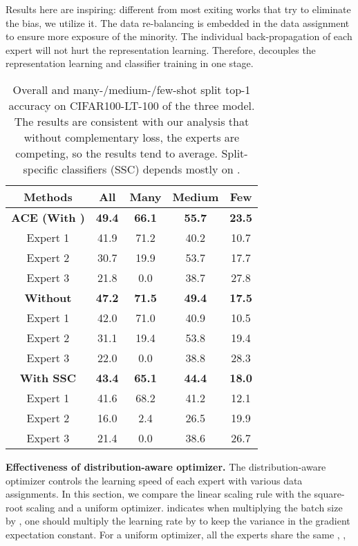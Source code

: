 \documentclass[10pt,twocolumn,letterpaper]{article}
\begin{document}
Results here are inspiring: different from most exiting works that try to eliminate the bias, we utilize it. The data re-balancing is embedded in the data assignment to ensure more exposure of the minority. The individual back-propagation of each expert will not hurt the representation learning. Therefore,  decouples the representation learning and classifier training in one stage.

\begin{table}[h]
\begin{center}
\small
\begin{tabular}{c|c|c c c}
\toprule[1.5pt]
\textbf{Methods} &  \textbf{All} & \textbf{Many} & \textbf{Medium} & \textbf{Few}\\\hline\hline
 \textbf{ACE (With )} &  \textbf{49.4} & \textbf{66.1} & \textbf{55.7} & \textbf{23.5}\\
 \rowcolor{gray!10} Expert 1 & 41.9  & 71.2 & 40.2 & 10.7\\
 \rowcolor{gray!10} Expert 2 &  30.7 & 19.9 & 53.7 & 17.7\\
 \rowcolor{gray!10} Expert 3 &  21.8 & 0.0 & 38.7 & 27.8\\\hline
\textbf{Without } & \textbf{47.2}& \textbf{71.5} & \textbf{49.4} &\textbf{17.5}\\
 \rowcolor{gray!10} Expert 1 &  42.0 & 71.0 & 40.9 & 10.5 \\
 \rowcolor{gray!10} Expert 2 &  31.1 & 19.4 & 53.8 & 19.4\\
 \rowcolor{gray!10} Expert 3 &  22.0 & 0.0 & 38.8 & 28.3\\
 \textbf{With SSC} & \textbf{43.4} & \textbf{65.1} & \textbf{44.4} & \textbf{18.0}\\
 \rowcolor{gray!10} Expert 1 &  41.6 & 68.2 & 41.2 & 12.1\\
 \rowcolor{gray!10} Expert 2 &  16.0 & 2.4 & 26.5 & 19.9\\
 \rowcolor{gray!10} Expert 3 &  21.4 &  0.0 & 38.6 & 26.7\\
\bottomrule[1.5pt]
\end{tabular}
\end{center}
\caption{Overall and many-/medium-/few-shot split top-1 accuracy on CIFAR100-LT-100 of the three model. The results are consistent with our analysis that without complementary loss, the experts are competing, so the results tend to average. Split-specific classifiers (SSC) depends mostly on .}
\label{tab:abs-lcom}
\end{table}

\textbf{Effectiveness of distribution-aware optimizer.} The distribution-aware optimizer controls the learning speed of each expert with various data assignments. In this section, we compare the linear scaling rule with the square-root scaling \cite{krizhevsky2014one} and a uniform optimizer. \cite{krizhevsky2014one} indicates when multiplying the batch size by , one should multiply the learning rate by  to keep the variance in the gradient expectation constant. For a uniform optimizer, all the experts share the same , \ie,
\end{document}
